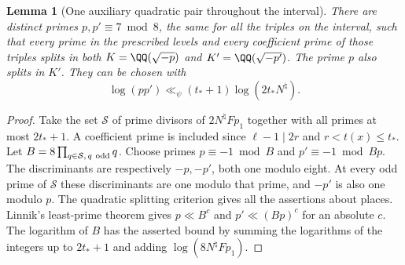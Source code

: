 \documentclass[a4paper,11pt]{article}
\newtheorem{lemma}[proposition]{Lemma}
\theoremstyle{definition}
\theoremstyle{remark}
\numberwithin{equation}{section}
\begin{document}
\begin{lemma}[One auxiliary quadratic pair throughout the interval]
\leavevmode\label{lem:twoprimes571}
There are distinct primes \(p,p'\equiv7\bmod8\), the same
for all the triples on the interval, such that every prime
in the prescribed levels and every coefficient prime of those
triples splits in both \(K=\QQ(\sqrt{-p})\) and
\(K'=\QQ(\sqrt{-p'})\). The prime \(p\) also splits in \(K'\).
They can be chosen with
\[
       \log(pp')\ll_\psi (t_*+1)\log(2t_*N^\natural).
\]
\end{lemma}
\begin{proof}
Take the set \(\mathcal S\) of prime divisors of
\(2N^\natural Fp_1\) together with all primes at most
\(2t_*+1\). A coefficient prime is included since
\(\ell-1\mid 2r\) and \(r<t(x)\le t_*\).
Let \(B=8\prod_{q\in\mathcal S,\,q\ {\rm odd}}q\).
Choose primes \(p\equiv-1\bmod B\) and
\(p'\equiv-1\bmod Bp\). The discriminants are respectively
\(-p,-p'\), both one modulo eight. At every odd prime of
\(\mathcal S\) these discriminants are one modulo that prime,
and \(-p'\) is also one modulo \(p\). The quadratic splitting
criterion gives all the assertions about places. Linnik's
least-prime theorem gives \(p\ll B^{c}\) and
\(p'\ll(Bp)^c\) for an absolute \(c\). The logarithm of
\(B\) has the asserted bound by summing the logarithms of
the integers up to \(2t_*+1\) and adding
\(\log(8N^\natural Fp_1)\).
\end{proof}
\end{document}
